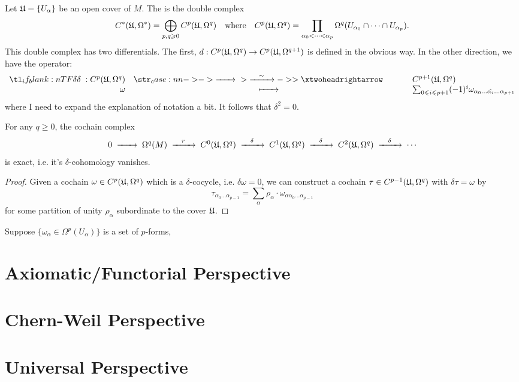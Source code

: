 Let $\mathfrak{U}=\{U_\alpha\}$ be an open cover of $M$. The  is the double complex
\[
	C^*(\mathfrak{U}, \Omega^*) = \bigoplus_{p,q\geqslant 0} C^p(\mathfrak{U}, \Omega^q)\quad\textrm{where}\quad C^p(\mathfrak{U}, \Omega^q) = \prod_{\alpha_0 < \cdots < \alpha_{p}}\Omega^q(U_{\alpha_0}\cap \cdots \cap U_{\alpha_p}).
\]
This double complex has two differentials. The first, $d : C^p(\mathfrak{U}, \Omega^q) \to C^p(\mathfrak{U}, \Omega^{q+1})$ is defined in the obvious way. In the other direction, we have the operator:
\[
	\lkxfunc{\delta}{C^p(\Ufr, \Omega^q)}{C^{p+1}(\Ufr, \Omega^q)}{\omega}{\sum_{0\leq i \leq p+1} (-1)^i \omega_{\alpha_0\ldots\hat{\alpha_i}\ldots \alpha_{p+1}}}
\]
where I need to expand the explanation of notation a bit. It follows that $\delta^2= 0$.

\begin{theorem}
	For any $q \geq 0$, the cochain complex
	\[
		\begin{array}{rcl}
			0 \lkxto \Omega^q(M) \lkxto[r] C^0(\Ufr, \Omega^q) \lkxto[\delta]
			C^1(\Ufr, \Omega^q) \lkxto[\delta] C^2(\Ufr, \Omega^q) \lkxto[\delta]\cdots
		\end{array}
	\]
	is exact, i.e. it's $\delta$-cohomology vanishes.
\end{theorem}

\begin{proof}
	Given a cochain $\omega\in C^p(\mathfrak{U}, \Omega^q)$ which is a $\delta$-cocycle, i.e. $\delta \omega = 0$, we can construct a cochain $\tau\in C^{p-1}(\mathfrak{U}, \Omega^q)$ with $\delta\tau = \omega$ by
	\[
		\tau_{\alpha_0\ldots\alpha_{p-1}} = \sum_{\alpha}\rho_\alpha\cdot \omega_{\alpha\alpha_0\ldots\alpha_{p-1}}
	\]
	for some partition of unity $\rho_\alpha$ subordinate to the cover $\mathfrak{U}$.
\end{proof}

\begin{corollary}
	Suppose $\{\omega_\alpha\in \Omega^p(U_\alpha)\}$ is a set of $p$-forms,
\end{corollary}

\section{Axiomatic/Functorial Perspective}

\section{Chern-Weil Perspective}

\section{Universal Perspective}

